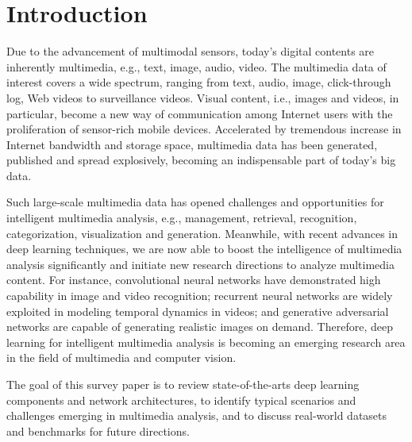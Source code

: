 
\section{Introduction}
\label{sec:intro}

Due to the advancement of multimodal sensors, today's digital contents are inherently multimedia, e.g., text, image, audio, video. The multimedia data of interest covers a wide spectrum, ranging from text, audio, image, click-through log, Web videos to surveillance videos. Visual content, i.e., images and videos, in particular, become a new way of communication among Internet users with the proliferation of sensor-rich mobile devices. Accelerated by tremendous increase in Internet bandwidth and storage space, multimedia data has been generated, published and spread explosively, becoming an indispensable part of today's big data. 

Such large-scale multimedia data has opened challenges and opportunities for intelligent multimedia analysis, e.g., management, retrieval, recognition, categorization, visualization and generation. Meanwhile, with recent advances in deep learning techniques, we are now able to boost the intelligence of multimedia analysis significantly and initiate new research directions to analyze multimedia content. For instance, convolutional neural networks have demonstrated high capability in image and video recognition; recurrent neural networks are widely exploited in modeling temporal dynamics in videos; and generative adversarial networks are capable of generating realistic images on demand. Therefore, deep learning for intelligent multimedia analysis is becoming an emerging research area in the field of multimedia and computer vision.

The goal of this survey paper is to review state-of-the-arts deep learning components and network architectures, to identify typical scenarios and challenges emerging in multimedia analysis, and to discuss real-world datasets and benchmarks for future directions. 



